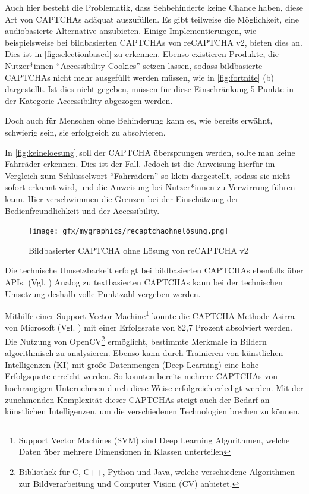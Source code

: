 Auch hier besteht die Problematik, dass Sehbehinderte keine Chance haben, diese Art von CAPTCHAs adäquat auszufüllen.
Es gibt teilweise die Möglichkeit, eine audiobasierte Alternative anzubieten. 
Einige Implementierungen, wie beispielsweise bei bildbasierten CAPTCHAs von reCAPTCHA v2, bieten dies an. 
Dies ist in \autoref{fig:selectionbased} zu erkennen.
Ebenso existieren Produkte, die Nutzer*innen ``Accessibility-Cookies'' setzen lassen, 
sodass bildbasierte CAPTCHAs nicht mehr ausgefüllt werden müssen, wie in \autoref{fig:fortnite} (b) dargestellt.
Ist dies nicht gegeben, müssen für diese Einschränkung 5 Punkte in der Kategorie Accessibility abgezogen werden.

Doch auch für Menschen ohne Behinderung kann es, wie bereits erwähnt, schwierig sein, sie erfolgreich zu absolvieren.

\pagebreak

In \autoref{fig:keineloesung} soll der CAPTCHA übersprungen werden, sollte man keine Fahrräder erkennen.
Dies ist der Fall. 
Jedoch ist die Anweisung hierfür im Vergleich zum Schlüsselwort ``Fahrrädern'' so klein dargestellt, sodass sie nicht sofort erkannt wird,
und die Anweisung bei Nutzer*innen zu Verwirrung führen kann.
Hier verschwimmen die Grenzen bei der Einschätzung der Bedienfreundlichkeit und der Accessibility.

\begin{figure}[h!]
    \centering
    \texttt{[image: gfx/mygraphics/recaptchaohnelösung.png]}
    \caption{Bildbasierter CAPTCHA ohne Lösung von reCAPTCHA v2}   
    \label{fig:keineloesung}
\end{figure}

Die technische Umsetzbarkeit erfolgt bei bildbasierten CAPTCHAs ebenfalls über APIs. (Vgl. \cite{hcaptcha} \cite{arkoselabs} \cite{geetest})
Analog zu textbasierten CAPTCHAs kann bei der technischen Umsetzung deshalb volle Punktzahl vergeben werden.

Mithilfe einer Support Vector Machine\footnote[4]{Support Vector Machines (SVM) sind Deep Learning Algorithmen, welche Daten über mehrere Dimensionen in Klassen unterteilen} 
konnte die CAPTCHA-Methode Asirra von Microsoft (Vgl. \cite{elson2007asirra})
mit einer Erfolgsrate von 82,7 Prozent absolviert werden. 
Die Nutzung von OpenCV\footnote[5]{Bibliothek für C, C++, Python und Java, welche verschiedene Algorithmen zur Bildverarbeitung und Computer Vision (CV) anbietet.}
ermöglicht, bestimmte Merkmale in Bildern algorithmisch zu analysieren.
Ebenso kann durch Trainieren von künstlichen Intelligenzen (KI) mit große Datenmengen (Deep Learning) eine hohe Erfolgsquote erreicht werden.
So konnten bereits mehrere CAPTCHAs von hochrangigen Unternehmen durch diese Weise erfolgreich erledigt werden.
Mit der zunehmenden Komplexität dieser CAPTCHAs steigt auch der Bedarf an künstlichen Intelligenzen, um die verschiedenen Technologien brechen zu können.

